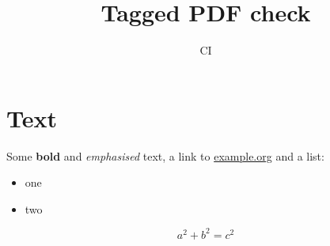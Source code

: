 \documentclass{article}
\title{Tagged PDF check}
\author{CI}
\begin{document}
\maketitle
\section{Text}
Some \textbf{bold} and \emph{emphasised} text, a link to \href{https://example.org}{example.org}
and a list:
\begin{itemize}
  \item one
  \item two
\end{itemize}
\begin{equation}
  a^2 + b^2 = c^2
\end{equation}
\end{document}
